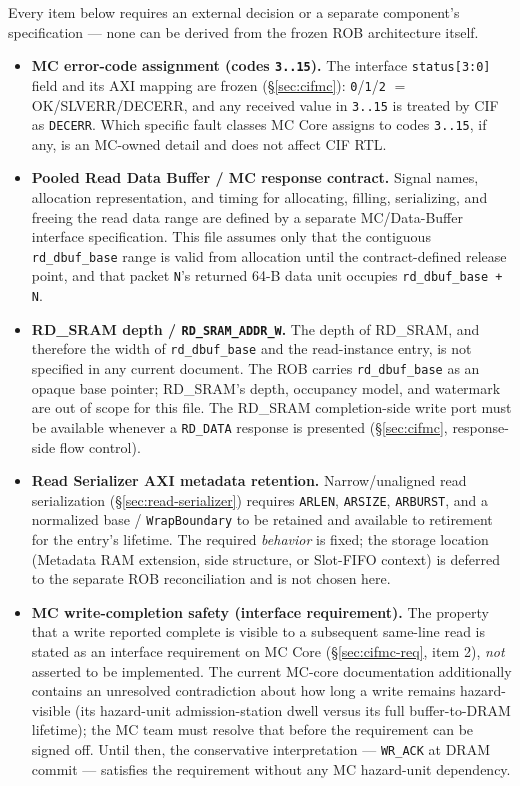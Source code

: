 Every item below requires an external decision or a separate component's specification --- none can be derived from the frozen ROB architecture itself.

\begin{itemize}[noitemsep]
  \item \textbf{MC error-code assignment (codes \texttt{3..15}).} The interface \texttt{status[3:0]} field and its AXI mapping are frozen (\S\ref{sec:cifmc}): \texttt{0}/\texttt{1}/\texttt{2} $=$ OK/SLVERR/DECERR, and any received value in \texttt{3..15} is treated by CIF as \texttt{DECERR}. Which specific fault classes MC Core assigns to codes \texttt{3..15}, if any, is an MC-owned detail and does not affect CIF RTL.
  \item \textbf{Pooled Read Data Buffer / MC response contract.} Signal names, allocation representation, and timing for allocating, filling, serializing, and freeing the read data range are defined by a separate MC/Data-Buffer interface specification. This file assumes only that the contiguous \texttt{rd\_dbuf\_base} range is valid from allocation until the contract-defined release point, and that packet \texttt{N}'s returned 64-B data unit occupies \texttt{rd\_dbuf\_base + N}.
  \item \textbf{RD\_SRAM depth / \texttt{RD\_SRAM\_ADDR\_W}.} The depth of RD\_SRAM, and therefore the width of \texttt{rd\_dbuf\_base} and the read-instance entry, is not specified in any current document. The ROB carries \texttt{rd\_dbuf\_base} as an opaque base pointer; RD\_SRAM's depth, occupancy model, and watermark are out of scope for this file. The RD\_SRAM completion-side write port must be available whenever a \texttt{RD\_DATA} response is presented (\S\ref{sec:cifmc}, response-side flow control).
  \item \textbf{Read Serializer AXI metadata retention.} Narrow/unaligned read serialization (\S\ref{sec:read-serializer}) requires \texttt{ARLEN}, \texttt{ARSIZE}, \texttt{ARBURST}, and a normalized base / \texttt{WrapBoundary} to be retained and available to retirement for the entry's lifetime. The required \emph{behavior} is fixed; the storage location (Metadata RAM extension, side structure, or Slot-FIFO context) is deferred to the separate ROB reconciliation and is not chosen here.
  \item \textbf{MC write-completion safety (interface requirement).} The property that a write reported complete is visible to a subsequent same-line read is stated as an interface requirement on MC Core (\S\ref{sec:cifmc-req}, item 2), \emph{not} asserted to be implemented. The current MC-core documentation additionally contains an unresolved contradiction about how long a write remains hazard-visible (its hazard-unit admission-station dwell versus its full buffer-to-DRAM lifetime); the MC team must resolve that before the requirement can be signed off. Until then, the conservative interpretation --- \texttt{WR\_ACK} at DRAM commit --- satisfies the requirement without any MC hazard-unit dependency.
\end{itemize}

